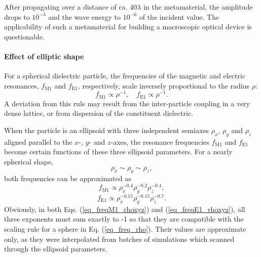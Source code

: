 After propagating over a distance of ca. $40\lambda$ in the metamaterial, the amplitude drops to $10^{-3}$ and the wave energy to $10^{-6}$ of the incident value. The applicability of such a metamaterial for building a macroscopic optical device is questionable. %


\paragraph{Effect of elliptic shape}%
For a spherical dielectric particle, the frequencies of the magnetic and electric resonances, $f_{\text{M1}}$ and $f_{\text{E1}}$, respectively, scale inversely proportional to the radius $\rho$:
\begin{equation} f_{\text{M1}} \propto \rho^{-1}, \quad f_{\text{E1}} \propto \rho^{-1}. \label{eq_freq_rho}\end{equation}
A deviation from this rule may result from the inter-particle coupling in a very dense lattice, or from dispersion of the constituent dielectric.

When the particle is an ellipsoid with three independent semiaxes $\rho_x$, $\rho_y$ and $\rho_z$ aligned parallel to the $x$-, $y$- and $z$-axes, the resonance frequencies $f_{\text{M1}}$ and $f_{\text{E1}}$ become certain functions of these three ellipsoid parameters. For a nearly spherical shape, 
$$\rho_x \sim \rho_y \sim \rho_z,$$
both frequencies can be approximated as 
\begin{equation}  f_{\text{M1}} \propto \rho_x^{-0.4}  \rho_y^{-0.2} \rho_z^{-0.4}, \label{eq_freqM1_rhoxyz}\end{equation}
\begin{equation}  f_{\text{E1}} \propto \rho_x^{-0.15}  \rho_y^{-0.15} \rho_z^{-0.7}. \label{eq_freqE1_rhoxyz}\end{equation}
Obviously,  in both Eqs. (\ref{eq_freqM1_rhoxyz}) and (\ref{eq_freqE1_rhoxyz}), all three exponents must sum exactly to -1 so that they are compatible with the scaling rule for a sphere in Eq. (\ref{eq_freq_rho}). Their values are approximate only, as they were interpolated from batches of simulations which scanned through the ellipsoid parameters.

